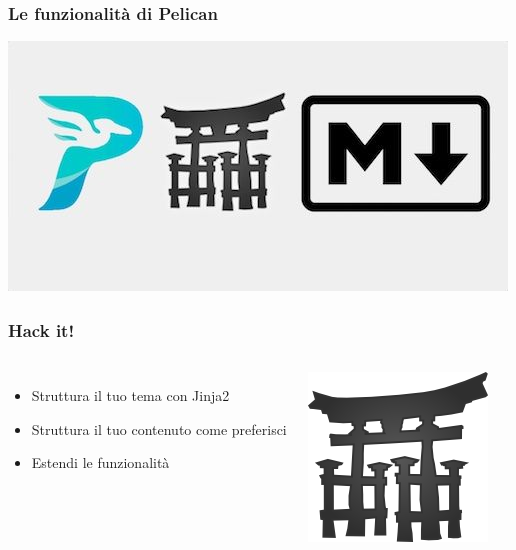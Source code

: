 \begin{frame}
	\frametitle{Le funzionalità di Pelican}
	\begin{center}
		\includegraphics[scale=0.5]{img/pelican_stuff}
	\end{center}
\end{frame}

\begin{frame}
	\frametitle{Hack it!}
	\begin{columns}
		\begin{itemize}
			\item Struttura il tuo tema con Jinja2
			\item Struttura il tuo contenuto come preferisci
			\item Estendi le funzionalità
		\end{itemize}
		\begin{center}
			\includegraphics[scale=1]{img/jinja.png}
		\end{center}
	\end{columns}

\end{frame}


